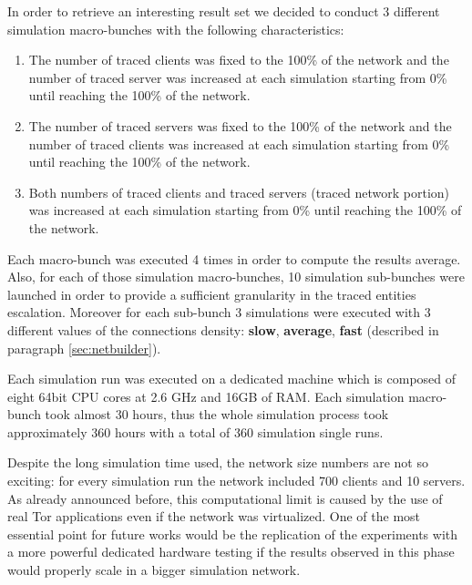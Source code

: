 In order to retrieve an interesting result set we decided to conduct
3 different simulation macro-bunches with the following characteristics:
\begin{enumerate}
	\item The number of traced clients was fixed to the 100\% of the
network and the number of traced server was increased at each simulation
starting from 0\% until reaching the 100\% of the network.
	\item The number of traced servers was fixed to the 100\% of the
network and the number of traced clients was increased at each simulation
starting from 0\% until reaching the 100\% of the network.
	\item Both numbers of traced clients and traced servers (traced
network portion) was increased at each simulation
starting from 0\% until reaching the 100\% of the network.
\end{enumerate}

Each macro-bunch was executed 4 times in order to compute the results
average. 
Also, for each of those simulation macro-bunches, 10 simulation sub-bunches were
launched in order to provide a sufficient granularity in the traced
entities escalation. Moreover for each sub-bunch 3 simulations were 
executed with 3 different values of the connections density: \textbf{slow},
\textbf{average}, \textbf{fast} (described in paragraph
\ref{sec:netbuilder}). 

Each simulation run was executed on a dedicated machine which is
composed of eight 64bit CPU cores at 2.6 GHz and 16GB of RAM. Each simulation
macro-bunch took almost 30 hours, thus the whole simulation process took
approximately 360 hours with a total of 360 simulation single runs.

Despite the long simulation time used, the network size numbers are not
so exciting: for every simulation run the network included 700 clients
and 10 servers. As already announced before, this computational limit is
caused by the use of real Tor applications even if the network was
virtualized. One of the most essential point for future works would be
the replication of the experiments with a more powerful dedicated hardware testing
if the results observed in this phase would properly scale in a bigger
simulation network. 

